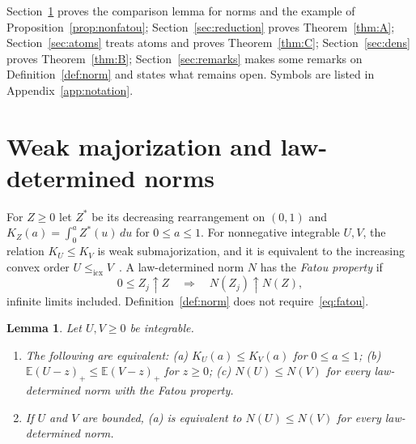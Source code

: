 \documentclass[11pt]{amsart}
\newtheorem{lemma}[theorem]{Lemma}
\theoremstyle{definition}
\newcommand{\E}{\mathbb{E}}
\newcommand{\icx}{\le_{\mathrm{icx}}}
\begin{document}
Section~\ref{sec:norms} proves the comparison lemma for norms and the example of Proposition~\ref{prop:nonfatou};
Section~\ref{sec:reduction} proves Theorem~\ref{thm:A}; Section~\ref{sec:atoms} treats atoms and proves
Theorem~\ref{thm:C}; Section~\ref{sec:dens} proves Theorem~\ref{thm:B}; Section~\ref{sec:remarks} makes some remarks
on Definition~\ref{def:norm} and states what remains open. Symbols are listed in Appendix~\ref{app:notation}.

\section{Weak majorization and law-determined norms}\label{sec:norms}

For $Z\ge0$ let $Z^*$ be its decreasing rearrangement on $(0,1)$ and $K_Z(a)=\int_0^aZ^*(u)\,du$ for $0\le a\le1$.
For nonnegative integrable $U,V$, the relation $K_U\le K_V$ is weak submajorization, and it is equivalent to the
increasing convex order $U\icx V$~\cite[Section~4.A]{SS07}. A law-determined norm $N$ has the \emph{Fatou property} if
\begin{equation}\label{eq:fatou}
0\le Z_j\uparrow Z\quad\Longrightarrow\quad N(Z_j)\uparrow N(Z),
\end{equation}
infinite limits included. Definition~\ref{def:norm} does not require~\eqref{eq:fatou}.

\begin{lemma}\label{lem:comp}
Let $U,V\ge0$ be integrable.
\begin{enumerate}
\item The following are equivalent: (a) $K_U(a)\le K_V(a)$ for $0\le a\le1$; (b) $\E(U-z)_+\le\E(V-z)_+$ for $z\ge0$;
(c) $N(U)\le N(V)$ for every law-determined norm with the Fatou property.
\item If $U$ and $V$ are bounded, (a) is equivalent to $N(U)\le N(V)$ for every law-determined norm.
\end{enumerate}
\end{lemma}
\end{document}
